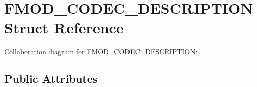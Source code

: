 \hypertarget{struct_f_m_o_d___c_o_d_e_c___d_e_s_c_r_i_p_t_i_o_n}{\section{F\+M\+O\+D\+\_\+\+C\+O\+D\+E\+C\+\_\+\+D\+E\+S\+C\+R\+I\+P\+T\+I\+O\+N Struct Reference}
\label{struct_f_m_o_d___c_o_d_e_c___d_e_s_c_r_i_p_t_i_o_n}
}


Collaboration diagram for F\+M\+O\+D\+\_\+\+C\+O\+D\+E\+C\+\_\+\+D\+E\+S\+C\+R\+I\+P\+T\+I\+O\+N\+:
\subsection*{Public Attributes}
